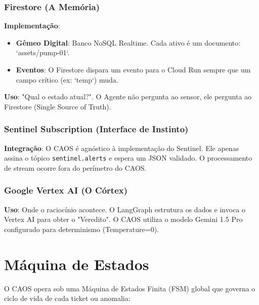 \documentclass[12pt, a4paper]{article}
\begin{document}
\subsubsection{Firestore (A Memória)}
\textbf{Implementação}:
\begin{itemize}
    \item \textbf{Gêmeo Digital}: Banco NoSQL Realtime. Cada ativo é um documento: `assets/pump-01`.
    \item \textbf{Eventos}: O Firestore dispara um evento para o Cloud Run sempre que um campo crítico (ex: `temp`) muda.
\end{itemize}
\textbf{Uso}: "Qual o estado atual?". O Agente não pergunta ao sensor, ele pergunta ao Firestore (Single Source of Truth).

\subsubsection{Sentinel Subscription (Interface de Instinto)}
\textbf{Integração}: O CAOS é agnóstico à implementação do Sentinel. Ele apenas assina o tópico \texttt{sentinel.alerts} e espera um JSON validado. O processamento de stream ocorre fora do perímetro do CAOS.

\subsubsection{Google Vertex AI (O Córtex)}
\textbf{Uso}: Onde o raciocínio acontece. O LangGraph estrutura os dados e invoca o Vertex AI para obter o "Veredito". O CAOS utiliza o modelo Gemini 1.5 Pro configurado para determinismo (Temperature=0).

\newpage

\section{Máquina de Estados}
\label{sec:fsm}

O CAOS opera sob uma Máquina de Estados Finita (FSM) global que governa o ciclo de vida de cada ticket ou anomalia:
\end{document}
